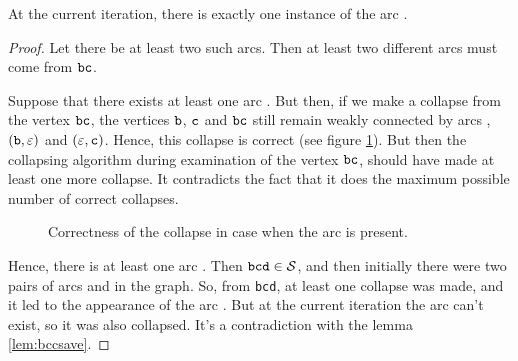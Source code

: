\begin{lemma}
\label{lem:bbcone}
At the current iteration, there is exactly one instance of the arc .
\end{lemma}
\begin{proof}
Let there be at least two such arcs. Then at least two different arcs must come from $ {\tt bc} $.

Suppose that there exists at least one arc . But then, if we make a collapse from the vertex $ {\tt bc} $, the vertices $ {\tt b} $, $ {\tt c} $ and $ {\tt bc} $ still remain weakly connected by arcs , $ ({\tt b}, \varepsilon) $ and $ (\varepsilon, {\tt c}) $. Hence, this collapse is correct (see figure \ref{fig:lvl1lemmabcc}). But then the collapsing algorithm during examination of the vertex $ {\tt bc} $, should have made at least one more collapse. It contradicts the fact that it does the maximum possible number of correct collapses.

\begin{figure}[ht]
\begin{center}

\end{center}

\caption{Correctness of the collapse in case when the arc  is present.}\label{fig:lvl1lemmabcc}
\end{figure}

Hence, there is at least one arc . Then $ {\tt bcd} \in {\cal S} $, and then initially there were two pairs of arcs  and  in the graph. So, from {\tt bcd}, at least one collapse was made, and it led to the appearance of the arc . But at the current iteration the arc  can't exist, so it was also collapsed. It's a contradiction with the lemma \ref{lem:bccsave}.
\end{proof}

